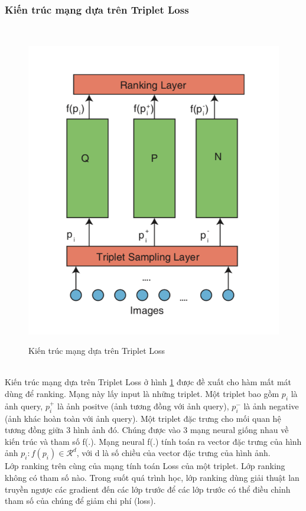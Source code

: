 \documentclass[a4paper,14pt]{extreport}
\begin{document}
\subsubsection*{ Kiến trúc mạng dựa trên Triplet Loss }
\\
\begin{figure}  
    \centering
    \includegraphics[scale=0.8]{img/triplet.png}
    \caption{Kiến trúc mạng dựa trên Triplet Loss}
    \cite{paper-5}
    \label{fig:triplet}
\end{figure}
\\
Kiến trúc mạng dựa trên Triplet Loss ở hình \ref{fig:triplet} \cite{paper-5} được đề xuất cho hàm mất mát dùng để ranking. Mạng này lấy input là những triplet. Một triplet bao gồm $p_i$ là ảnh query, $p_i^{+}$ là ảnh positve (ảnh tương đồng với ảnh query), $p_i^{-}$ là ảnh negative (ảnh khác hoàn toàn với ảnh query). Một triplet đặc trưng cho mối quan hệ tương đồng giữa 3 hình ảnh đó. Chúng được vào 3 mạng neural giống nhau về kiến trúc và tham số f(.). Mạng neural f(.) tính toán ra vector đặc trưng của hình ảnh $p_i: f(p_i) \in \mathcal{R}^d$, với d là số chiều của vector đặc trưng của hình ảnh.
\\
Lớp ranking trên cùng của mạng tính toán Loss của một triplet. Lớp ranking không có tham số nào. Trong suốt quá trình học, lớp ranking dùng giải thuật lan truyền ngược các gradient đến các lớp trước để các lớp trước có thể điều chỉnh tham số của chúng để giảm chi phí (loss).
\end{document}
